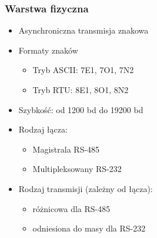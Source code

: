 		\subsubsection{Warstwa fizyczna}
		\begin{itemize}
			\item Asynchroniczna transmisja znakowa
			\item Formaty znaków
			\begin{itemize}
				\item Tryb ASCII: 7E1, 7O1, 7N2
				\item Tryb RTU: 8E1, 8O1, 8N2
			\end{itemize}
			\item Szybkość: od 1200 bd do 19200 bd
			\item Rodzaj łącza:
			\begin{itemize}
				\item Magistrala RS-485
				\item Multipleksowany RS-232
			\end{itemize}
			\item Rodzaj transmisji (zależny od łącza):
			\begin{itemize}
				\item różnicowa dla RS-485
				\item odniesiona do masy dla RS-232
			\end{itemize}
		\end{itemize}